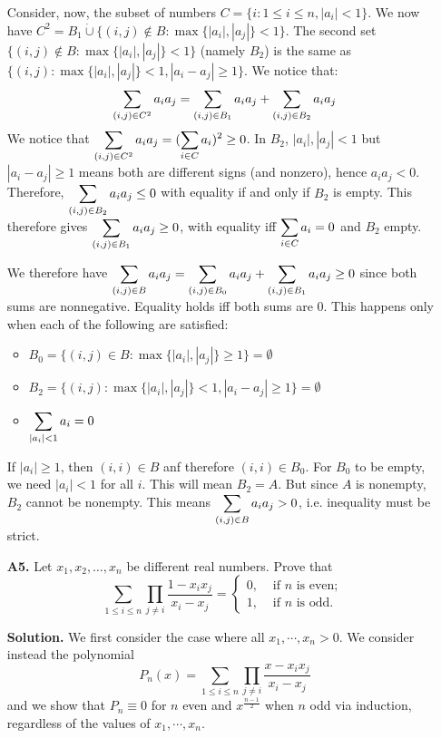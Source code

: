 \documentclass[11pt,a4paper]{article}
\begin{document}
\begin{enumerate}
	Consider, now, the subset of numbers $C=\{i: 1\le i\le n, |a_i|<1\}$. We now have $C^2 = B_1\dot\cup \{(i, j)\not\in B: \max\{|a_i|, |a_j|\}< 1\}$. The second set $\{(i, j)\not\in B: \max\{|a_i|, |a_j|\}< 1\}$ (namely $B_2$) is the same as $\{(i, j) : \max\{|a_i|, |a_j|\}< 1, |a_i-a_j|\ge 1\}$. We notice that: 
	\[
	\dsum_{(i, j) \in C^2}a_ia_j
	=\dsum_{(i, j) \in B_1}a_ia_j+\dsum_{(i, j) \in B_2}a_ia_j
	\]
	We notice that $\dsum_{(i, j) \in C^2}a_ia_j=(\dsum_{i \in C} a_i)^2\ge 0$. In $B_2$, $|a_i|, |a_j|<1$ but $|a_i-a_j|\ge 1$ means both are different signs (and nonzero), hence $a_ia_j<0$. Therefore, $\dsum_{(i, j) \in B_2}a_ia_j\le 0$ with equality if and only if $B_2$ is empty. This therefore gives $\dsum_{(i, j) \in B_1}a_ia_j\ge 0$, with equality iff $\dsum_{i \in C} a_i=0$ and $B_2$ empty. 
	
	We therefore have $\dsum_{(i, j) \in B}a_ia_j=\dsum_{(i, j) \in B_0}a_ia_j+\dsum_{(i, j) \in B_1}a_ia_j\ge 0$ since both sums are nonnegative. Equality holds iff both sums are 0. This happens only when each of the following are satisfied: 
	\begin{itemize}
		\item $B_0=\{(i, j)\in B: \max\{|a_i|, |a_j|\}\ge 1\}=\emptyset$
		\item $B_2=\{(i, j) : \max\{|a_i|, |a_j|\}< 1, |a_i-a_j|\ge 1\}=\emptyset$
		\item $\dsum_{|a_i|<1}a_i=0$
	\end{itemize}
	If $|a_i|\ge 1$, then $(i, i)\in B$ anf therefore $(i, i)\in B_0$. For $B_0$ to be empty, we need $|a_i|<1$ for all $i$. This will mean $B_2=A$. But since $A$ is nonempty, $B_2$ cannot be nonempty. This means $\dsum_{(i, j)\in B}a_ia_j>0$, i.e. inequality must be strict. 
	
	\item[\textbf{A5.}] Let $x_1, x_2, \dots, x_n$ be different real numbers. Prove that
	\[\sum_{1 \leqslant i \leqslant n} \prod_{j \neq i} \frac{1-x_{i} x_{j}}{x_{i}-x_{j}}=\left\{\begin{array}{ll}
	0, & \text { if } n \text { is even; } \\
	1, & \text { if } n \text { is odd. }
	\end{array}\right.\]
	
	\textbf{Solution.} 
	We first consider the case where all $x_1, \cdots , x_n > 0$. 
	We consider instead the polynomial 
	\[
	P_n(x)=\sum_{1 \leqslant i \leqslant n} \prod_{j \neq i} \frac{x-x_{i} x_{j}}{x_{i}-x_{j}}
	\]
	and we show that $P_n\equiv 0$ for $n$ even and $x^{\frac{n-1}{2}}$ when $n$ odd via induction, regardless of the values of $x_1, \cdots, x_n$. 
	

\end{enumerate}
\end{document}
